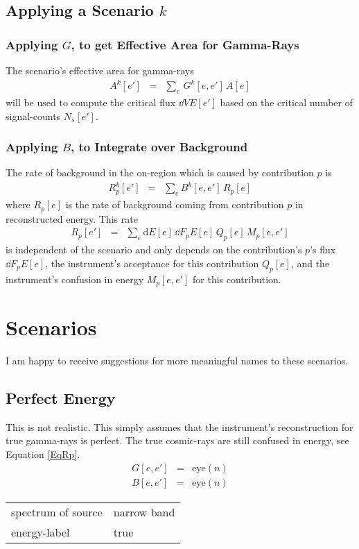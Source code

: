 \documentclass{article}%
\begin{document}
\subsection{Applying a Scenario $k$}
%
\subsubsection*{Applying $G$, to get Effective Area for Gamma-Rays}
%
The scenario's effective area for gamma-rays
%
\begin{eqnarray}
A^k[e'] &=& \sum_{e} \, G^k[e, e'] \, A[e]
\end{eqnarray}
%
will be used to compute the critical flux $\dd{V}{E}[e']$ based on the critical number of signal-counts $N_s[e']$.
%
\subsubsection*{Applying $B$, to Integrate over Background}
%
The rate of background in the on-region which is caused by contribution $p$ is
%
\begin{eqnarray}
R^k_p[e'] &=& \sum_{e} B^k[e, e'] \, R_p[e]
\end{eqnarray}
%
where $R_p[e]$ is the rate of background coming from contribution $p$ in reconstructed energy.
%
This rate
%
\begin{eqnarray}
R_p[e'] &=& \sum_{e} \text{d}E[e] \, \dd{F_p}{E}[e] \, Q_p[e] \, M_p[e, e']
\label{EqRp}
\end{eqnarray}
%
 is independent of the scenario and only depends on the contribution's $p$'s flux $\dd{F_p}{E}[e]$, the instrument's acceptance for this contribution $Q_p[e]$, and the instrument's confusion in energy $M_p[e, e']$ for this contribution.
%
\section{Scenarios}
%
I am happy to receive suggestions for more meaningful names to these scenarios.
%
\subsection{Perfect Energy}
%
This is not realistic. This simply assumes that the instrument's reconstruction for true gamma-rays is perfect.
%
The true cosmic-rays are still confused in energy, see Equation \ref{EqRp}.
%
\begin{eqnarray}
G[e, e'] &=& \mathrm{eye}(n)
\\
B[e, e'] &=& \mathrm{eye}(n)
\end{eqnarray}
%
\begin{center}
\begin{tabular}{ll}
spectrum of source & narrow band\\
energy-label & true\\
\end{tabular}
\end{center}
%
\end{document}
